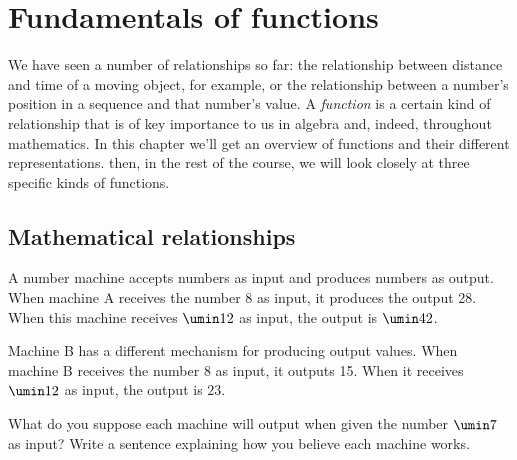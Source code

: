 \chapter{Fundamentals of functions}
\label{ch:functions}



We have seen a number of relationships so far: the relationship between distance and time of a moving object, for example, or the relationship between a number's position in a sequence and that number's value. A \textit{function} is a certain kind of relationship that is of key importance to us in algebra and, indeed, throughout mathematics. In this chapter we'll get an overview of functions and their different representations. then, in the rest of the course, we will look closely at three specific kinds of functions.

\section{Mathematical relationships}
\label{sec:mathrelationships}


\begin{boxexplore}
A number machine accepts numbers as input and produces numbers as output. When machine A receives the number 8 as input, it produces the output 28. When this machine receives $\umin12$ as input, the output is $\umin42$.

Machine B has a different mechanism for producing output values. When machine B receives the number 8 as input, it outputs 15. When it receives $\umin12$ as input, the output is $23$.

What do you suppose each machine will output when given the number $\umin7$ as input? Write a sentence explaining how you believe each machine works.
\end{boxexplore} %

